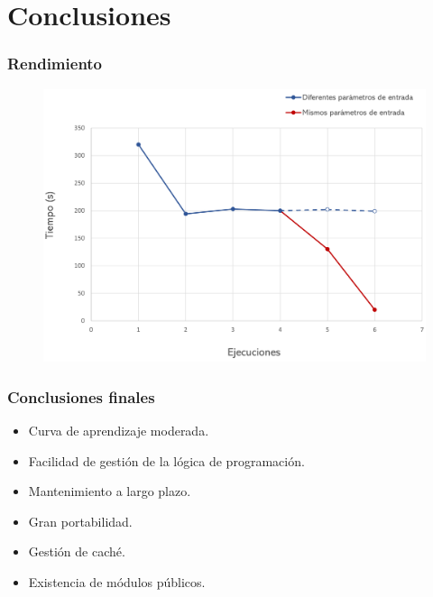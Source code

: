 \documentclass{beamer}
\begin{document}
\section{Conclusiones}
\begin{frame}
    \frametitle{Rendimiento}
    \begin{figure}
        \includegraphics[scale=0.52]{figuras/graph-times}
    \end{figure}
\end{frame}

\begin{frame}
    \frametitle{Conclusiones finales}
    \begin{itemize}
        \item Curva de aprendizaje moderada.
        \item Facilidad de gestión de la lógica de programación.
        \item Mantenimiento a largo plazo.
        \item Gran portabilidad.
        \item Gestión de caché.
        \item Existencia de módulos públicos.
    \end{itemize}
\end{frame}

\section*{}
\begin{frame}
    \titlepage
\end{frame}
\end{document}
